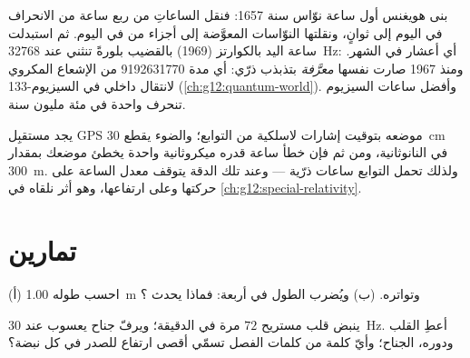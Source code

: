 \begin{example}\label{ex:g12:oscillators-and-time:clocks}
بنى هويغنس أول ساعة نوّاس سنة \num{1657}: فنقل 
الساعاتِ من ربع ساعة من الانحراف في اليوم إلى ثوانٍ،
ونقلتها النوّاسات المعوَّضة إلى أجزاء من  في اليوم. ثم استبدلت ساعة
اليد بالكوارتز (\num{1969}) بالقضيب بلورةً تنثني عند
\qty{32768}{Hz}: أي أعشار  في الشهر. ومنذ \num{1967} صارت
 نفسها \emph{معرَّفة} بتذبذب ذرّي: أي
مدة \num{9192631770}  من الإشعاع المكروي لانتقال
داخلي في السيزيوم-133 (\cref{ch:g12:quantum-world}). وأفضل
ساعات السيزيوم تنحرف  واحدة في مئة مليون سنة.
\end{example}

\begin{remark}\label{rem:g12:oscillators-and-time:gps}
يجد مستقبِل GPS موضعه بتوقيت إشارات لاسلكية من
التوابع؛ والضوء يقطع \qty{30}{cm} في النانوثانية، ومن ثم فإن خطأ
ساعة قدره ميكروثانية واحدة يخطئ موضعك بمقدار \qty{300}{m}. ولذلك
تحمل التوابع ساعات ذرّية --- وعند تلك الدقة يتوقف معدل
الساعة على  حركتها وعلى ارتفاعها، وهو أثر
نلقاه في \cref{ch:g12:special-relativity}.
\end{remark}

\section{تمارين}

\begin{exercise}[$\star$]\label{exo:g12:oscillators-and-time:1}
(أ) احسب   طوله \qty{1.00}{m} وتواتره. (ب) ويُضرب
الطول في أربعة: فماذا يحدث ؟
\end{exercise}

\begin{exercise}[$\star$]\label{exo:g12:oscillators-and-time:2}
ينبض قلب مستريح $72$ مرة في الدقيقة؛ ويرفّ جناح يعسوب عند
\qty{30}{Hz}. أعطِ  القلب ودوره،  الجناح؛
وأيّ كلمة من كلمات الفصل تسمّي أقصى ارتفاع للصدر في كل نبضة؟
\end{exercise}

